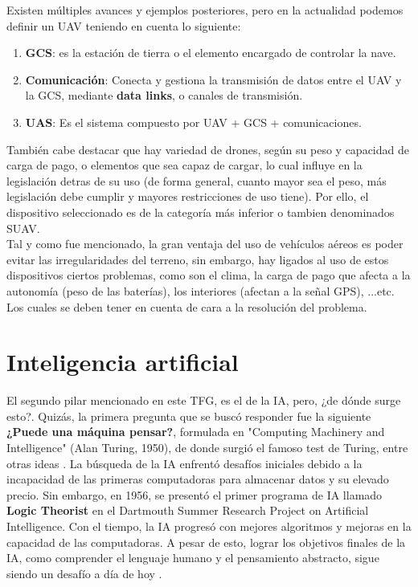 Existen múltiples avances y ejemplos posteriores, pero en la actualidad podemos definir un \ac{UAV} teniendo en cuenta lo siguiente:

\begin{enumerate}
	\item \textbf{\ac{GCS}}: es la estación de tierra o el elemento encargado de controlar la nave.

	\item \textbf{Comunicación}: Conecta y gestiona la transmisión de datos entre el \ac{UAV} y la \ac{GCS}, mediante \textbf{data links}, o canales de transmisión.
	
    \item \textbf{\ac{UAS}}: Es el sistema compuesto por \ac{UAV} + \ac{GCS} + comunicaciones.
\end{enumerate}

También cabe destacar que hay variedad de drones, según su peso y capacidad de carga de pago, o elementos que sea capaz de cargar, lo cual influye en la legislación detras de su uso (de forma general, cuanto mayor sea el peso, más legislación debe cumplir y mayores restricciones de uso tiene). Por ello, el dispositivo seleccionado es de la categoría más inferior o tambien denominados \ac{SUAV}.\\

Tal y como fue mencionado, la gran ventaja del uso de vehículos aéreos es poder evitar las irregularidades del terreno, sin embargo, hay ligados al uso de estos dispositivos ciertos problemas, como son el clima, la carga de pago que afecta a la autonomía (peso de las baterías), los interiores (afectan a la señal GPS), ...etc. Los cuales se deben tener en cuenta de cara a la resolución del problema.\\

\section{Inteligencia artificial}
\label{subsec:inteligencia_artificial}

El segundo pilar mencionado en este \ac{TFG}, es el de la \ac{IA}, pero, ¿de dónde surge esto?. Quizás, la primera pregunta que se buscó responder fue la siguiente \textbf{¿Puede una máquina pensar?}, formulada en "Computing Machinery and Intelligence" (Alan Turing, 1950), de donde surgió el famoso test de Turing, entre otras ideas \cite{turing-ai}. La búsqueda de la \ac{IA} enfrentó desafíos iniciales debido a la incapacidad de las primeras computadoras para almacenar datos y su elevado precio. Sin embargo, en 1956, se presentó el primer programa de \ac{IA} llamado \textbf{Logic Theorist} en el Dartmouth Summer Research Project on Artificial Intelligence. Con el tiempo, la IA progresó con mejores algoritmos y mejoras en la capacidad de las computadoras. A pesar de esto, lograr los objetivos finales de la IA, como comprender el lenguaje humano y el pensamiento abstracto, sigue siendo un desafío a día de hoy \cite{history-ai}.\\

